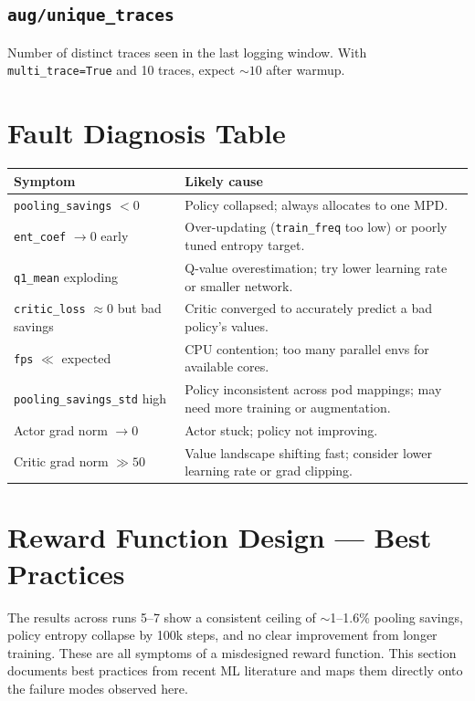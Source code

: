 \documentclass[11pt]{article}
\begin{document}
\subsection*{\texttt{aug/unique\_traces}}
Number of distinct traces seen in the last logging window.
With \texttt{multi\_trace=True} and 10 traces, expect $\sim10$ after warmup.

\section{Fault Diagnosis Table}

\begin{center}
\begin{tabular}{p{6cm}p{8cm}}
\toprule
Symptom & Likely cause \\
\midrule
\texttt{pooling\_savings} $< 0$ &
  Policy collapsed; always allocates to one MPD. \\
\texttt{ent\_coef} $\to 0$ early &
  Over-updating (\texttt{train\_freq} too low) or poorly tuned entropy target. \\
\texttt{q1\_mean} exploding &
  Q-value overestimation; try lower learning rate or smaller network. \\
\texttt{critic\_loss} $\approx 0$ but bad savings &
  Critic converged to accurately predict a bad policy's values. \\
\texttt{fps} $\ll$ expected &
  CPU contention; too many parallel envs for available cores. \\
\texttt{pooling\_savings\_std} high &
  Policy inconsistent across pod mappings; may need more training or augmentation. \\
Actor grad norm $\to 0$ &
  Actor stuck; policy not improving. \\
Critic grad norm $\gg 50$ &
  Value landscape shifting fast; consider lower learning rate or grad clipping. \\
\bottomrule
\end{tabular}
\end{center}

\section{Reward Function Design --- Best Practices}

The results across runs 5--7 show a consistent ceiling of $\sim$1--1.6\% pooling
savings, policy entropy collapse by 100k steps, and no clear improvement from
longer training.  These are all symptoms of a misdesigned reward function.
This section documents best practices from recent ML literature and maps them
directly onto the failure modes observed here.
\end{document}
